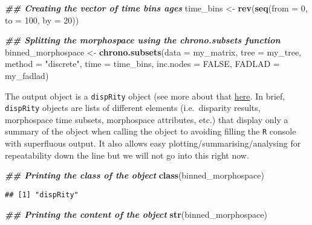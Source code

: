 \documentclass[
]{book}
\newenvironment{Shaded}{\begin{snugshade}}{\end{snugshade}}
\newcommand{\AttributeTok}[1]{\textcolor[rgb]{0.13,0.29,0.53}{#1}}
\newcommand{\ConstantTok}[1]{\textcolor[rgb]{0.56,0.35,0.01}{#1}}
\newcommand{\DecValTok}[1]{\textcolor[rgb]{0.00,0.00,0.81}{#1}}
\newcommand{\DocumentationTok}[1]{\textcolor[rgb]{0.56,0.35,0.01}{\textbf{\textit{#1}}}}
\newcommand{\FunctionTok}[1]{\textcolor[rgb]{0.13,0.29,0.53}{\textbf{#1}}}
\newcommand{\NormalTok}[1]{#1}
\newcommand{\OtherTok}[1]{\textcolor[rgb]{0.56,0.35,0.01}{#1}}
\newcommand{\StringTok}[1]{\textcolor[rgb]{0.31,0.60,0.02}{#1}}
\begin{document}
\begin{Shaded}
\begin{Highlighting}[]
\DocumentationTok{\#\# Creating the vector of time bins ages}
\NormalTok{time\_bins }\OtherTok{\textless{}{-}} \FunctionTok{rev}\NormalTok{(}\FunctionTok{seq}\NormalTok{(}\AttributeTok{from =} \DecValTok{0}\NormalTok{, }\AttributeTok{to =} \DecValTok{100}\NormalTok{, }\AttributeTok{by =} \DecValTok{20}\NormalTok{))}

\DocumentationTok{\#\# Splitting the morphospace using the chrono.subsets function}
\NormalTok{binned\_morphospace }\OtherTok{\textless{}{-}} \FunctionTok{chrono.subsets}\NormalTok{(}\AttributeTok{data =}\NormalTok{ my\_matrix, }\AttributeTok{tree =}\NormalTok{ my\_tree,}
    \AttributeTok{method =} \StringTok{"discrete"}\NormalTok{, }\AttributeTok{time =}\NormalTok{ time\_bins, }\AttributeTok{inc.nodes =} \ConstantTok{FALSE}\NormalTok{,}
    \AttributeTok{FADLAD =}\NormalTok{ my\_fadlad)}
\end{Highlighting}
\end{Shaded}

The output object is a \texttt{dispRity} object (see more about that \protect\hyperlink{The-guts-of-the-dispRity-package}{here}.
In brief, \texttt{dispRity} objects are lists of different elements (i.e.~disparity results, morphospace time subsets, morphospace attributes, etc.) that display only a summary of the object when calling the object to avoiding filling the \texttt{R} console with superfluous output.
It also allows easy plotting/summarising/analysing for repeatability down the line but we will not go into this right now.

\begin{Shaded}
\begin{Highlighting}[]
\DocumentationTok{\#\# Printing the class of the object}
\FunctionTok{class}\NormalTok{(binned\_morphospace)}
\end{Highlighting}
\end{Shaded}

\begin{verbatim}
## [1] "dispRity"
\end{verbatim}

\begin{Shaded}
\begin{Highlighting}[]
\DocumentationTok{\#\# Printing the content of the object}
\FunctionTok{str}\NormalTok{(binned\_morphospace)}
\end{Highlighting}
\end{Shaded}
\end{document}
